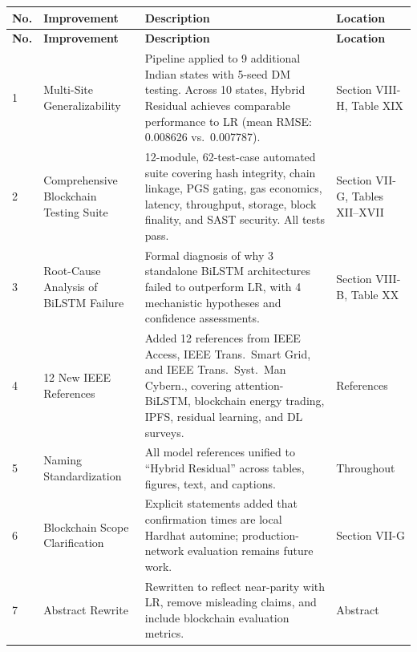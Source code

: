 \documentclass[11pt,a4paper]{article}
\begin{document}
\begin{longtable}{|p{0.5cm}|p{3.5cm}|p{7.5cm}|p{2.5cm}|}
\hline
\textbf{No.} & \textbf{Improvement} & \textbf{Description} & \textbf{Location} \\
\hline
\endfirsthead
\hline
\textbf{No.} & \textbf{Improvement} & \textbf{Description} & \textbf{Location} \\
\hline
\endhead

1 & Multi-Site Generalizability & Pipeline applied to 9 additional Indian states with 5-seed DM testing. Across 10 states, Hybrid Residual achieves comparable performance to LR (mean RMSE: 0.008626 vs.\ 0.007787). & Section VIII-H, Table XIX \\
\hline

2 & Comprehensive Blockchain Testing Suite & 12-module, 62-test-case automated suite covering hash integrity, chain linkage, PGS gating, gas economics, latency, throughput, storage, block finality, and SAST security. All tests pass. & Section VII-G, Tables XII--XVII \\
\hline

3 & Root-Cause Analysis of BiLSTM Failure & Formal diagnosis of why 3 standalone BiLSTM architectures failed to outperform LR, with 4 mechanistic hypotheses and confidence assessments. & Section VIII-B, Table XX \\
\hline

4 & 12 New IEEE References & Added 12 references from IEEE Access, IEEE Trans.\ Smart Grid, and IEEE Trans.\ Syst.\ Man Cybern., covering attention-BiLSTM, blockchain energy trading, IPFS, residual learning, and DL surveys. & References \\
\hline

5 & Naming Standardization & All model references unified to ``Hybrid Residual'' across tables, figures, text, and captions. & Throughout \\
\hline

6 & Blockchain Scope Clarification & Explicit statements added that confirmation times are local Hardhat automine; production-network evaluation remains future work. & Section VII-G \\
\hline

7 & Abstract Rewrite & Rewritten to reflect near-parity with LR, remove misleading claims, and include blockchain evaluation metrics. & Abstract \\
\hline

\end{longtable}
\end{document}
